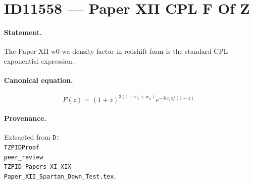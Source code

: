 \section*{ID11558 --- Paper XII CPL F Of Z}

\paragraph{Statement.}
The Paper XII w0-wa density factor in redshift form is the standard CPL exponential expression.

\paragraph{Canonical equation.}
\[
F(z)=(1+z)^{3(1+w_0+w_a)}e^{-3w_a z/(1+z)}
\]

\paragraph{Provenance.}
Extracted from \texttt{D:\\TZPIDProof\\peer\_review\\TZPID\_Papers\_XI\_XIX\\Paper\_XII\_Spartan\_Dawn\_Test.tex}.
